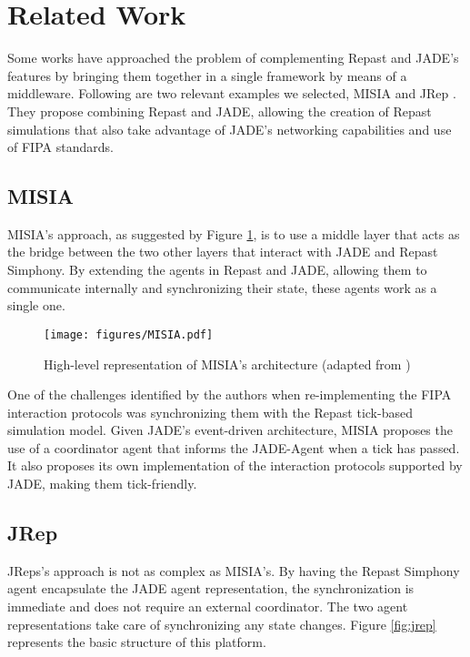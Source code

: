 \section{Related Work} %
\label{sec:related_work}

Some works have approached the problem of complementing Repast and JADE's features by bringing them together in a single framework by means of a middleware.
Following are two relevant examples we selected, MISIA \cite{garcia2011misia} and JRep \cite{gormer2011jrep}. They propose combining Repast and \gls{JADE}, allowing the creation of Repast simulations that also take advantage of JADE's networking capabilities and use of \gls{FIPA} standards.

\subsection{MISIA}
MISIA's approach, as suggested by Figure \ref{fig:misia}, is to use a middle layer that acts as the bridge between the two other layers that interact with JADE and Repast Simphony.
By extending the agents in Repast and JADE, allowing them to communicate internally and synchronizing their state, these agents work as a single one.

\begin{figure}
	\centering
	\texttt{[image: figures/MISIA.pdf]}
	\caption{High-level representation of MISIA's architecture (adapted from \cite{garcia2011misia})}
	\label{fig:misia}
\end{figure}

One of the challenges identified by the authors when re-implementing the FIPA interaction protocols was synchronizing them with the Repast tick-based simulation model.
Given JADE's event-driven architecture, MISIA proposes the use of a coordinator agent that informs the JADE-Agent when a tick has passed.
It also proposes its own implementation of the interaction protocols supported by JADE, making them tick-friendly.

\subsection{JRep}
JReps's approach is not as complex as MISIA's.
By having the Repast Simphony agent encapsulate the JADE agent representation, the synchronization is immediate and does not require an external coordinator.
The two agent representations take care of synchronizing any state changes.
Figure \ref{fig:jrep} represents the basic structure of this platform.

